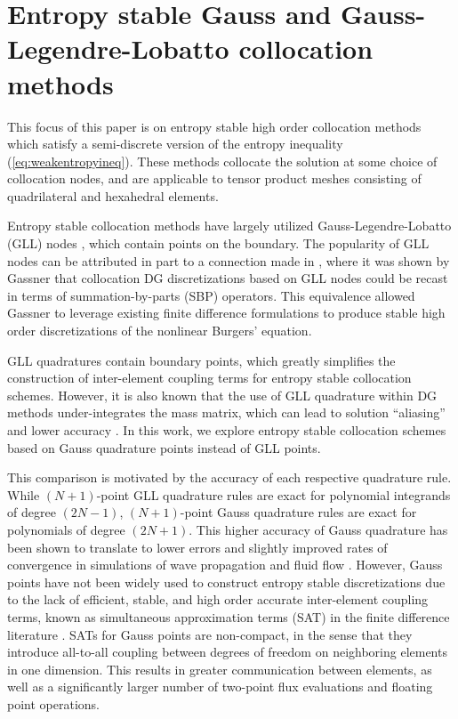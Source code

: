 \documentclass[onefignum,onetabnum,final]{siamart171218}
\begin{document}
\section{Entropy stable Gauss and Gauss-Legendre-Lobatto collocation methods}
\label{sec:1}

This focus of this paper is on entropy stable high order collocation methods which satisfy a semi-discrete version of the entropy inequality (\ref{eq:weakentropyineq}).  These methods collocate the solution at some choice of collocation nodes, and are applicable to tensor product meshes consisting of quadrilateral and hexahedral elements.  

Entropy stable collocation methods have largely utilized Gauss-Legendre-Lobatto (GLL) nodes \cite{fisher2013high, carpenter2014entropy, gassner2016split, gassner2017br1}, which contain points on the boundary.  The popularity of GLL nodes can be attributed in part to a connection made in \cite{gassner2013skew}, where it was shown by Gassner that collocation DG discretizations based on GLL nodes could be recast in terms of summation-by-parts (SBP) operators.  This equivalence allowed Gassner to leverage existing finite difference formulations to produce stable high order discretizations of the nonlinear Burgers' equation.  

GLL quadratures contain boundary points, which greatly simplifies the construction of inter-element coupling terms for entropy stable collocation schemes.  However, it is also known that the use of GLL quadrature within DG methods under-integrates the mass matrix, which can lead to solution ``aliasing'' and lower accuracy \cite{parsani2016entropy}.  In this work, we explore entropy stable collocation schemes based on Gauss quadrature points instead of GLL points.  

This comparison is motivated by the accuracy of each respective quadrature rule.  While $(N+1)$-point GLL quadrature rules are exact for polynomial integrands of degree $(2N-1)$, $(N+1)$-point Gauss quadrature rules are exact for polynomials of degree $(2N+1)$.  This higher accuracy of Gauss quadrature has been shown to translate to lower errors and slightly improved rates of convergence in simulations of wave propagation and fluid flow \cite{kopriva2010quadrature, hindenlang2012explicit, chan2015gpu}.  However, Gauss points have not been widely used to construct entropy stable discretizations due to the lack of efficient, stable, and high order accurate inter-element coupling terms, known as simultaneous approximation terms (SAT) in the finite difference literature \cite{fernandez2014review, crean2017high, fernandez2018simultaneous}.  SATs for Gauss points are non-compact, in the sense that they introduce all-to-all coupling between degrees of freedom on neighboring elements in one dimension.  This results in greater communication between elements, as well as a significantly larger number of two-point flux evaluations and floating point operations.  
\end{document}
